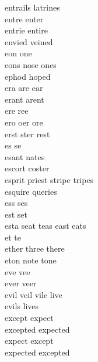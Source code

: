 entrails latrines\\
entre enter\\
entrie entire\\
envied veined\\
eon one\\
eons nose ones\\
ephod hoped\\
era are ear\\
erant arent\\
ere ree\\
ero oer ore\\
erst ster rest\\
es se\\
esant nates\\
escort coster\\
esprit priest stripe tripes\\
esquire queries\\
ess ses\\
est set\\
esta seat teas east eats\\
et te\\
ether three there\\
eton note tone\\
eve vee\\
ever veer\\
evil veil vile live\\
evils lives\\
except expect\\
excepted expected\\
expect except\\
expected excepted\\

